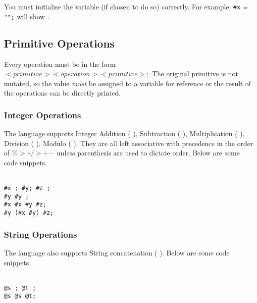 \documentclass[11pt]{article}
\begin{document}
You must initialise the variable (if chosen to do so) correctly. For example: \LET \texttt{\#x = "";} will show .

\subsection{Primitive Operations}

Every operation must be in the form $<primitive> <operation> <primitive>;$ The original primitive is not mutated, so the value \emph{must} be assigned to a variable for reference or the result of the operations can be directly printed. 

\subsubsection{Integer Operations}
The language supports Integer Addition ( \PLUS), Subtraction ( \MINUS), Multiplication ( \TIMES), Division ( \DIVIDE), Modulo ( \MOD). They are all left associative with precedence in the order of $\MOD > \TIMES \DIVIDE > \PLUS \MINUS$ unless parenthesis are used to dictate order. Below are some code snippets.

\begin{texto}
	\texttt{\\
		\LET \#x ;
		\LET \#y;
		\LET \#z ;\\
        \#y \ASS \#y ;  \\
        \#x \ASS \#x \PLUS \#y \TIMES \#z;  \\
        \#y \ASS (\#x \PLUS \#y) \TIMES \#z;  \\
	 }
\end{texto}

\subsubsection{String Operations}
The language also supports String concatenation ( \CAT). Below are some code snippets.

\begin{texto}
	\texttt{\\
		\LET @s \ASS {};
		\LET @t \ASS {};	\\
		@s \ASS @s \CAT {} \CAT @t;  		
	 }
\end{texto}
\end{document}

